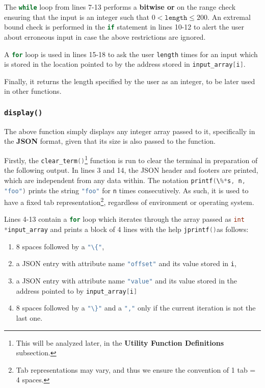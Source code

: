 \documentclass{article}
\newcommand{\code}[1]{\lstinline[language=C]!#1!}
\begin{document}
The \code{while} loop from lines 7-13 performs a \textbf{bitwise or} on the
range check ensuring that the input is an integer such that $0 < \texttt{length} \leq 200$. 
An extremal bound check is performed in the \code{if} statement in lines 10-12 to alert the user
about erroneous input in case the above restrictions are ignored.

A \code{for} loop is used in lines 15-18 to ask the user \code{length} times for an input which is
stored in the location pointed to by the address stored in \code{input_array[i]}.

Finally, it returns the length specified by the user as an integer, to be later used in other functions.


\newpage
 
\subsubsection{\texttt{display()}}



The above function simply displays any integer array passed to it, specifically in the \textbf{JSON}
format, given that its size is also passed to the function. 

Firstly, the \code{clear_term()}\footnote{This will be analyzed later, in the \textbf{Utility
Function Definitions} subsection.} function is run to clear the terminal in preparation of the
following output. In lines 3 and 14, the JSON header and footers are printed, which are
independent from any data within. The notation \code{printf(\%*s, n, "foo")} prints the string
\code{"foo"} for \code{n} times consecutively. As such, it is used to have a fixed tab
representation\footnote{Tab representations may vary, and thus we ensure the convention of
1 tab = 4 spaces.}, regardless of environment or operating system.

Lines 4-13 contain a \code{for} loop which iterates through the array passed as \code{int 
*input_array} and prints a block of 4 lines with the help \code{jprintf()}\footnotemark[1] as
follows: 

\begin{enumerate}
	\item 8 spaces followed by a \code{"\{"},
	\item a JSON entry with attribute name \code{"offset"} and its value stored in \code{i},
	\item a JSON entry with attribute name \code{"value"} and its value stored in the address
		pointed to by \code{input_array[i]}
	\item 8 spaces followed by a \code{"\}"} and a \code{","} only if the current iteration is not the last one.
\end{enumerate}
\end{document}
